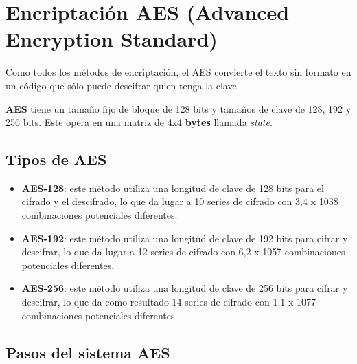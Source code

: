 \documentclass[a4paper, 12pt]{article}
\begin{document}
\section*{Encriptación AES (Advanced Encryption
Standard)}\label{encriptaciuxf3n-aes-advanced-encryption-standard}

Como todos los métodos de encriptación, el AES convierte el texto sin
formato en un código que sólo puede descifrar quien tenga la clave.

\textbf{AES} tiene un tamaño fijo de bloque de 128 bits y tamaños de
clave de 128, 192 y 256 bits. Este opera en una matriz de 4x4
\textbf{bytes} llamada \emph{state}.

\subsection*{Tipos de AES}\label{tipos-de-aes}

\begin{itemize}
\item
  \textbf{AES-128}: este método utiliza una longitud de clave de 128 bits para el
  cifrado y el descifrado, lo que da lugar a 10 series de cifrado con
  3,4 x 1038 combinaciones potenciales diferentes.
\item
  \textbf{AES-192}: este método utiliza una longitud de clave de 192 bits para
  cifrar y descifrar, lo que da lugar a 12 series de cifrado con 6,2 x
  1057 combinaciones potenciales diferentes.
\item
  \textbf{AES-256}: este método utiliza una longitud de clave de 256 bits para
  cifrar y descifrar, lo que da como resultado 14 series de cifrado con
  1,1 x 1077 combinaciones potenciales diferentes.
\end{itemize}

\subsection*{Pasos del sistema AES}\label{pasos-del-sistema-aes}
\end{document}
